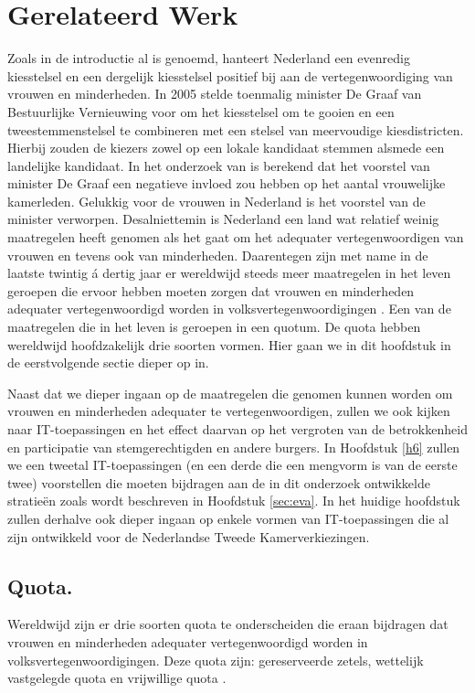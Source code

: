 \section{Gerelateerd Werk}
\label{sec:rel}
Zoals in de introductie al is genoemd, hanteert Nederland een evenredig kiesstelsel en een dergelijk kiesstelsel positief bij aan de vertegenwoordiging van vrouwen en minderheden. In 2005 stelde toenmalig minister De Graaf van Bestuurlijke Vernieuwing voor om het kiesstelsel om te gooien en een tweestemmenstelsel te combineren met een stelsel van meervoudige kiesdistricten. Hierbij zouden de kiezers zowel op een lokale kandidaat stemmen alsmede een landelijke kandidaat. In het onderzoek van \cite{norris2006impact} is berekend dat het voorstel van minister De Graaf een negatieve invloed zou hebben op het aantal vrouwelijke kamerleden. Gelukkig voor de vrouwen in Nederland is het voorstel van de minister verworpen. Desalniettemin is Nederland een land wat relatief weinig maatregelen heeft genomen als het gaat om het adequater vertegenwoordigen van vrouwen en tevens ook van minderheden. Daarentegen zijn met name in de laatste twintig á dertig jaar er wereldwijd steeds meer maatregelen in het leven geroepen die ervoor hebben moeten zorgen dat vrouwen en minderheden adequater vertegenwoordigd worden in volksvertegenwoordigingen \citep{norris2007opening}. Een van de maatregelen die in het leven is geroepen in een quotum. De quota hebben wereldwijd hoofdzakelijk drie soorten vormen. Hier gaan we in dit hoofdstuk in de eerstvolgende sectie dieper op in.

Naast dat we dieper ingaan op de maatregelen die genomen kunnen worden om vrouwen en minderheden adequater te vertegenwoordigen, zullen we ook kijken naar IT-toepassingen en het effect daarvan op het vergroten van de betrokkenheid en participatie van stemgerechtigden en andere burgers. In Hoofdstuk \ref{h6} zullen we een tweetal IT-toepassingen (en een derde die een mengvorm is van de eerste twee) voorstellen die moeten bijdragen aan de in dit onderzoek ontwikkelde stratie\"{e}n zoals wordt beschreven in Hoofdstuk \ref{sec:eva}. In het huidige hoofdstuk zullen derhalve ook dieper ingaan op enkele vormen van IT-toepassingen die al zijn ontwikkeld voor de Nederlandse Tweede Kamerverkiezingen. 

\subsection{Quota.} 
Wereldwijd zijn er drie soorten quota te onderscheiden die eraan bijdragen dat vrouwen en minderheden adequater vertegenwoordigd worden in volksvertegenwoordigingen. Deze quota zijn:  gereserveerde zetels, wettelijk vastgelegde quota en vrijwillige quota \citep{norris2007opening}. 

